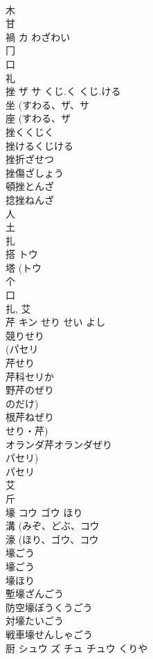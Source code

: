 \documentclass[8pt]{extreport}
\begin{document}
\begin{CJK}{UTF8}{min}
\\	木 
\\	甘 
\\	禍	カ	わざわい	
\\	冂 
\\	口 
\\	礼 
\\	挫	ザ サ	くじ.く くじ.ける	
\\	坐 (すわる、ザ、サ 
\\	座 (すわる、ザ 
\\	挫くくじく
\\	挫けるくじける
\\	挫折ざせつ
\\	挫傷ざしょう
\\	頓挫とんざ
\\	捻挫ねんざ
\\	人 
\\	土 
\\	扎	
\\	搭	トウ		
\\	塔 (トウ 
\\	个 
\\	口 
\\	扎, 艾 
\\	芹	キン	せり せい よし	
\\	競りせり 
\\	(パセリ 
\\	芹せり 
\\	芹科セリか 
\\	野芹のぜり 
\\	のだけ)
\\	根芹ねぜり 
\\	せり・芹) 
\\	オランダ芹オランダぜり 
\\	パセリ) 
\\	パセリ 
\\	艾 
\\	斤 
\\	壕	コウ ゴウ	ほり	
\\	溝 (みぞ、どぶ、コウ 
\\	濠 (ほり、ゴウ、コウ 
\\	壕ごう 
\\	壕ごう 
\\	壕ほり 
\\	塹壕ざんごう 
\\	防空壕ぼうくうごう 
\\	対壕たいごう 
\\	戦車壕せんしゃごう 
\\	厨	シュウ ズ チュ チュウ	くりや	

\end{CJK}
\end{document}
